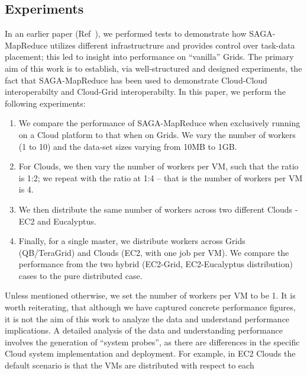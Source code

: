 \documentclass[conference,final]{IEEEtran}
\newcommand{\jhanote}[1]{ {\textcolor{red} { ***SJ: #1 }}}
\newcommand{\jhanote}[1]{}
\newcommand{\sagamapreduce }{SAGA-MapReduce }
\begin{document}

\subsection{Experiments} 
In an earlier paper (Ref~\cite{saga_ccgrid09}), we performed tests to
demonstrate how \sagamapreduce utilizes different infrastructrure and
provides control over task-data placement; this led to insight into
performance on ``vanilla'' Grids. The primary aim of this work is to
establish, via well-structured and designed experiments, the fact that
\sagamapreduce has been used to demonstrate Cloud-Cloud
interoperabilty and Cloud-Grid interoperabilty. In this paper, we
perform the following experiments:
\begin{enumerate}
\item We compare the performance of \sagamapreduce when exclusively
  running on a Cloud platform to that when on Grids. We vary the
  number of workers (1 to 10) and the data-set sizes varying from 10MB
  to 1GB.
\item For Clouds, we then vary the number of workers per VM, such that
  the ratio is 1:2; we repeat with the ratio at 1:4 -- that is the
  number of workers per VM is 4.
\item We then distribute the same number of workers across two
  different Clouds - EC2 and Eucalyptus.
\item Finally, for a single master, we distribute workers across Grids
  (QB/TeraGrid) and Clouds (EC2, with one job per VM). We compare the
  performance from the two hybrid (EC2-Grid, EC2-Eucalyptus
  distribution) cases to the pure distributed case.
\end{enumerate}
Unless mentioned otherwise, we set the number of workers per VM to be
1. It is worth reiterating, that although we have captured concrete
performance figures, it is not the aim of this work to analyze the
data and understand performance implications.  A detailed analysis of
the data and understanding performance involves the generation of
``system probes'', as there are differences in the specific Cloud
system implementation and deployment.  For example, in EC2 Clouds the
default scenario is that the VMs are distributed with respect to each
\end{document}
